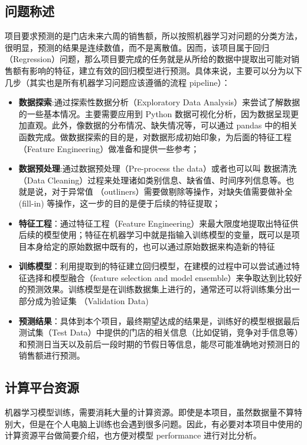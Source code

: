 \documentclass[a4paper]{article}
\begin{document}
\subsection{问题称述}
项目要求预测的是门店未来六周的销售额，所以按照机器学习对问题的分类方法，很明显，预测的结果是连续数值，而不是离散值。因而，该项目属于回归 （Regression）问题，那么项目要完成的任务就是从所给的数据中提取出可能对销售额有影响的特征，建立有效的回归模型进行预测。具体来说，主要可以分为以下几步（其实也是所有机器学习问题应该遵循的流程 pipeline）：
\begin{itemize}
    

\item{\textbf{数据探索}:通过探索性数据分析（Exploratory Data Analysis）来尝试了解数据的一些基本情况。主要需要应用到 Python 数据可视化分析，因为数据呈现更加直观。此外，像数据的分布情况、缺失情况等，可以通过 pandas 中的相关函数完成。做数据探索的目的是，对数据形成初始印象，为后面的特征工程（Feature Engineering）做准备和提供一些参考；}
\item{\textbf{数据预处理}:通过数据预处理（Pre-process the data）或者也可以叫 数据清洗 （Data Cleaning）过程来处理诸如类别信息、缺省值、时间序列信息等。也就是说，对于异常值 （outliners）需要做剔除等操作，对缺失值需要做补全 (fill-in) 等操作，这一步的目的是便于后续的特征提取；}
\item{\textbf{特征工程}：通过特征工程（Feature Engineering）来最大限度地提取出特征供后续的模型使用；特征在机器学习中就是指输入训练模型的变量，既可以是项目本身给定的原始数据中既有的，也可以通过原始数据来构造新的特征}
\item{\textbf{训练模型}：利用提取到的特征建立回归模型，在建模的过程中可以尝试通过特征选择和模型融合（feature selection and model ensemble）来争取达到比较好的预测效果。训练模型是在训练数据集上进行的，通常还可以将训练集分出一部分成为验证集 （Validation Data)}
\item{\textbf{预测结果}：具体到本个项目，最终期望达成的结果是，训练好的模型根据最后测试集（Test Data）中提供的门店的相关信息（比如促销，竞争对手信息等）和预测日当天以及前后一段时期的节假日等信息，能尽可能准确地对预测日的销售额进行预测。}

\end{itemize}
\subsection{计算平台资源}
机器学习模型训练，需要消耗大量的计算资源。即使是本项目，虽然数据量不算特别大，但是在个人电脑上训练也会遇到很多问题。因此，有必要对本项目中使用的计算资源平台做简要介绍，也方便对模型 performance 进行对比分析。
\end{document}
